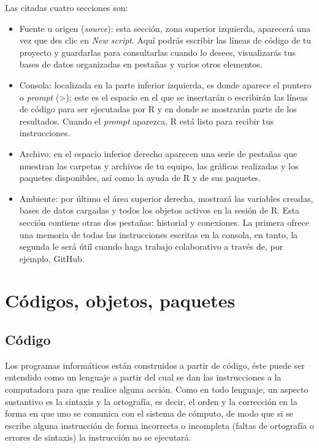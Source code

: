\documentclass[
  11pt,
  oneside]{book}
\providecommand{\tightlist}{%
  \setlength{\itemsep}{0pt}\setlength{\parskip}{0pt}}
\begin{document}
Las citadas cuatro secciones son:

\begin{itemize}
\tightlist
\item
  Fuente u origen (\emph{source}): esta sección, zona superior izquierda, aparecerá una vez que des clic en \emph{New script}. Aquí podrás escribir las líneas de código de tu proyecto y guardarlas para consultarlas cuando lo desees, visualizarás tus bases de datos organizadas en pestañas y varios otros elementos.
\item
  Consola: localizada en la parte inferior izquierda, es donde aparece el puntero o \emph{prompt} (\textgreater); este es el espacio en el que se insertarán o escribirán las líneas de código para ser ejecutadas por R y en donde se mostrarán parte de los resultados. Cuando el \emph{prompt} aparezca, R está listo para recibir tus instrucciones.
\item
  Archivo: en el espacio inferior derecho aparecen una serie de pestañas que muestran las carpetas y archivos de tu equipo, las gráficas realizadas y los paquetes disponibles, así como la ayuda de R y de sus paquetes.
\item
  Ambiente: por último el área superior derecha, mostrará las variables creadas, bases de datos cargadas y todos los objetos activos en la sesión de R. Esta sección contiene otras dos pestañas: historial y conexiones. La primera ofrece una memoria de todas las instrucciones escritas en la consola, en tanto, la segunda le será útil cuando haga trabajo colaborativo a través de, por ejemplo, GitHub.
\end{itemize}

\hypertarget{cuxf3digos-objetos-paquetes}{%
\section{Códigos, objetos, paquetes}\label{cuxf3digos-objetos-paquetes}}

\hypertarget{cuxf3digo}{%
\subsection{Código}\label{cuxf3digo}}

Los programas informáticos están construidos a partir de código, éste puede ser entendido como un lenguaje a partir del cual se dan las instrucciones a la computadora para que realice alguna acción. Como en todo lenguaje, un aspecto sustantivo es la sintaxis y la ortografía, es decir, el orden y la corrección en la forma en que uno se comunica con el sistema de cómputo, de modo que si se escribe alguna instrucción de forma incorrecta o incompleta (faltas de ortografía o errores de sintaxis) la instrucción no se ejecutará.
\end{document}
